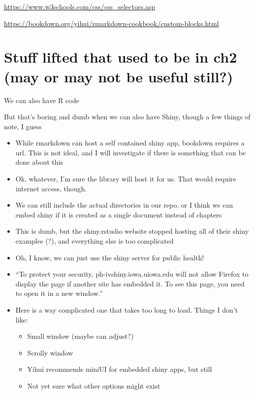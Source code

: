 \documentclass[
]{book}
\providecommand{\tightlist}{%
  \setlength{\itemsep}{0pt}\setlength{\parskip}{0pt}}
\theoremstyle{definition}
\theoremstyle{definition}
\theoremstyle{definition}
\theoremstyle{remark}
\begin{document}
\url{https://www.w3schools.com/css/css_selectors.asp}

\url{https://bookdown.org/yihui/rmarkdown-cookbook/custom-blocks.html}

\hypertarget{stuff-lifted-that-used-to-be-in-ch2-may-or-may-not-be-useful-still}{%
\section{Stuff lifted that used to be in ch2 (may or may not be useful still?)}\label{stuff-lifted-that-used-to-be-in-ch2-may-or-may-not-be-useful-still}}

We can also have R code

But that's boring and dumb when we can also have Shiny, though a few things of note, I guess

\begin{itemize}
\tightlist
\item
  While rmarkdown can host a self contained shiny app, bookdown requires a url. This is not ideal, and I will investigate if there is something that can be done about this
\item
  Ok, whatever, I'm sure the library will host it for us. That would require internet access, though.
\item
  We can still include the actual directories in our repo, or I think we can embed shiny if it is created as a single document instead of chapters
\item
  This is dumb, but the shiny.rstudio website stopped hosting all of their shiny examples (?), and everything else is too complicated
\item
  Oh, I know, we can just use the shiny server for public health!
\item
  ``To protect your security, ph-ivshiny.iowa.uiowa.edu will not allow Firefox to display the page if another site has embedded it. To see this page, you need to open it in a new window.''
\item
  Here is a way complicated one that takes too long to load. Things I don't like:

  \begin{itemize}
  \tightlist
  \item
    Small window (maybe can adjust?)
  \item
    Scrolly window
  \item
    Yihui recommends miniUI for embedded shiny apps, but still
  \item
    Not yet sure what other options might exist
  \end{itemize}
\end{itemize}
\end{document}
